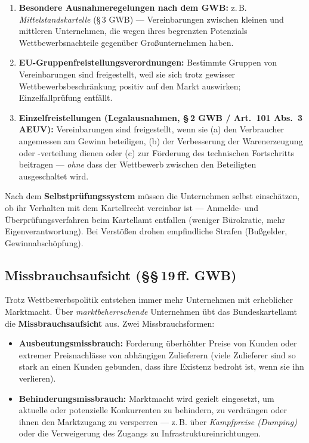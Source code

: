 \documentclass[11pt, a4paper]{article}
\begin{document}
\begin{enumerate}
  \item \textbf{Besondere Ausnahmeregelungen nach dem GWB:} z.\,B.
    \emph{Mittelstandskartelle} (\S\,3 GWB) --- Vereinbarungen zwischen kleinen und
    mittleren Unternehmen, die wegen ihres begrenzten Potenzials Wettbewerbsnachteile
    gegenüber Großunternehmen haben.
  \item \textbf{EU-Gruppenfreistellungsverordnungen:} Bestimmte Gruppen von Vereinbarungen
    sind freigestellt, weil sie sich trotz gewisser Wettbewerbsbeschränkung positiv auf
    den Markt auswirken; Einzelfallprüfung entfällt.
  \item \textbf{Einzelfreistellungen (Legalausnahmen, \S\,2 GWB / Art.~101 Abs.~3 AEUV):}
    Vereinbarungen sind freigestellt, wenn sie (a) den Verbraucher angemessen am Gewinn
    beteiligen, (b) der Verbesserung der Warenerzeugung oder -verteilung dienen oder
    (c) zur Förderung des technischen Fortschritts beitragen --- \emph{ohne} dass der
    Wettbewerb zwischen den Beteiligten ausgeschaltet wird.
\end{enumerate}

Nach dem \textbf{Selbstprüfungssystem} müssen die Unternehmen selbst einschätzen, ob ihr
Verhalten mit dem Kartellrecht vereinbar ist --- Anmelde- und Überprüfungsverfahren beim
Kartellamt entfallen (weniger Bürokratie, mehr Eigenverantwortung). Bei Verstößen drohen
empfindliche Strafen (Bußgelder, Gewinnabschöpfung).

\subsection{Missbrauchsaufsicht (\S\S\,19\,ff. GWB)}

Trotz Wettbewerbspolitik entstehen immer mehr Unternehmen mit erheblicher Marktmacht.
Über \emph{marktbeherrschende} Unternehmen übt das Bundeskartellamt die
\textbf{Missbrauchsaufsicht} aus. Zwei Missbrauchsformen:

\begin{itemize}
  \item \textbf{Ausbeutungsmissbrauch:} Forderung überhöhter Preise von Kunden oder
    extremer Preisnachlässe von abhängigen Zulieferern (viele Zulieferer sind so stark an
    einen Kunden gebunden, dass ihre Existenz bedroht ist, wenn sie ihn verlieren).
  \item \textbf{Behinderungsmissbrauch:} Marktmacht wird gezielt eingesetzt, um aktuelle
    oder potenzielle Konkurrenten zu behindern, zu verdrängen oder ihnen den Marktzugang
    zu versperren --- z.\,B. über \emph{Kampfpreise (Dumping)} oder die Verweigerung des
    Zugangs zu Infrastruktureinrichtungen.
\end{itemize}
\end{document}
